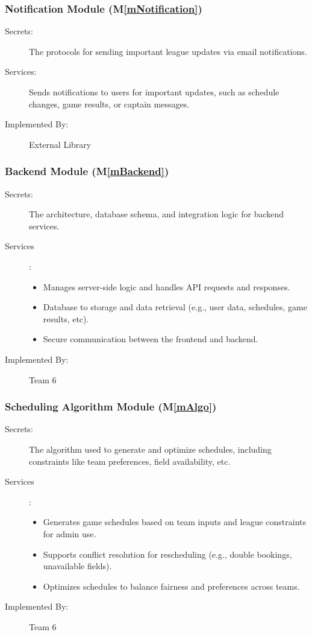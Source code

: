 \documentclass[12pt, titlepage]{article}
\newcommand{\mref}[1]{M\ref{#1}}
\begin{document}
\subsubsection{Notification Module (\mref{mNotification})}
\begin{description}
  \item[Secrets:] The protocols for sending important league updates via email notifications.
  \item[Services:] Sends notifications to users for important updates, such as schedule changes, game results, or captain messages.
  \item[Implemented By:] External Library
\end{description}



  \subsubsection{Backend Module (\mref{mBackend})}
  \begin{description}
    \item[Secrets:] The architecture, database schema, and integration logic for backend services.
    \item[Services]: 
      \begin{itemize}
        \item Manages server-side logic and handles API requests and responses.
        \item Database to storage and data retrieval (e.g., user data, schedules, game results, etc).
        \item Secure communication between the frontend and backend.
      \end{itemize}
    \item[Implemented By:] Team 6
  \end{description}

  \subsubsection{Scheduling Algorithm Module (\mref{mAlgo})}
  \begin{description}
    \item[Secrets:] The algorithm used to generate and optimize schedules, including constraints like team preferences, field availability, etc.
    \item[Services]:
      \begin{itemize}
        \item Generates game schedules based on team inputs and league constraints for admin use.
        \item Supports conflict resolution for rescheduling (e.g., double bookings, unavailable fields).
        \item Optimizes schedules to balance fairness and preferences across teams.
      \end{itemize}
    \item[Implemented By:] Team 6
  \end{description}
  
\end{document}

